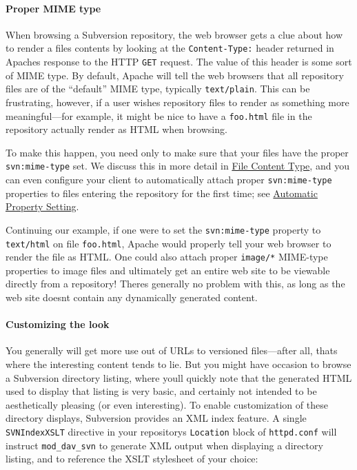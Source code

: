 \paragraph{Proper MIME
type}\label{svn.serverconfig.httpd.extra.browsing.mimetype}

When browsing a Subversion repository, the web browser gets a clue about
how to render a file\textquotesingle s contents by looking at the
\texttt{Content-Type:} header returned in Apache\textquotesingle s
response to the HTTP \texttt{GET} request. The value of this header is
some sort of MIME type. By default, Apache will tell the web browsers
that all repository files are of the ``default'' MIME type, typically
\texttt{text/plain}. This can be frustrating, however, if a user wishes
repository files to render as something more meaningful---for example,
it might be nice to have a \texttt{foo.html} file in the repository
actually render as HTML when browsing.

To make this happen, you need only to make sure that your files have the
proper \texttt{svn:mime-type} set. We discuss this in more detail in
\hyperref[svn.advanced.props.special.mime-type]{File Content Type}, and
you can even configure your client to automatically attach proper
\texttt{svn:mime-type} properties to files entering the repository for
the first time; see \hyperref[svn.advanced.props.auto]{Automatic
Property Setting}.

Continuing our example, if one were to set the \texttt{svn:mime-type}
property to \texttt{text/html} on file \texttt{foo.html}, Apache would
properly tell your web browser to render the file as HTML. One could
also attach proper \texttt{image/*} MIME-type properties to image files
and ultimately get an entire web site to be viewable directly from a
repository! There\textquotesingle s generally no problem with this, as
long as the web site doesn\textquotesingle t contain any dynamically
generated content.

\paragraph{Customizing the
look}\label{svn.serverconfig.httpd.extra.browsing.xslt}

You generally will get more use out of URLs to versioned files---after
all, that\textquotesingle s where the interesting content tends to lie.
But you might have occasion to browse a Subversion directory listing,
where you\textquotesingle ll quickly note that the generated HTML used
to display that listing is very basic, and certainly not intended to be
aesthetically pleasing (or even interesting). To enable customization of
these directory displays, Subversion provides an XML index feature. A
single \texttt{SVNIndexXSLT} directive in your
repository\textquotesingle s \texttt{Location} block of
\texttt{httpd.conf} will instruct \texttt{mod\_dav\_svn} to generate XML
output when displaying a directory listing, and to reference the XSLT
stylesheet of your choice:

